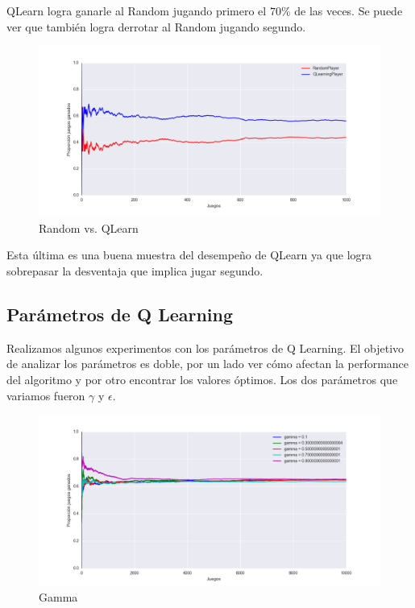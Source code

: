 \documentclass{article}
\begin{document}
QLearn logra ganarle al Random jugando primero el $70\%$ de las veces. Se puede
ver que también logra derrotar al Random jugando segundo.

\begin{figure}[H]
	\centerline{\includegraphics[width=1.3\textwidth]{figures/random_vs_qlearn.png}}
	\caption{Random vs. QLearn}
\end{figure}

Esta última es una buena muestra del desempeño de QLearn ya que logra sobrepasar
la desventaja que implica jugar segundo.





\subsection{Parámetros de Q Learning}

Realizamos algunos experimentos con los parámetros de Q Learning. El objetivo de
analizar los parámetros es doble, por un lado ver cómo afectan la performance
del algoritmo y por otro encontrar los valores óptimos. Los dos parámetros
que variamos fueron $\gamma$ y $\epsilon$.

\begin{figure}[H]
	\centerline{\includegraphics[width=1.3\textwidth]{figures/gamma.png}}
	\caption{Gamma}
\end{figure}
\end{document}
